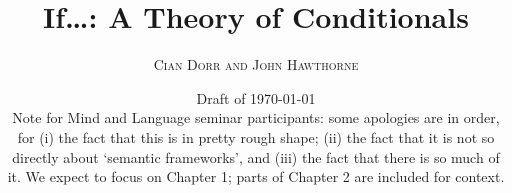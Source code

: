 \documentclass[leqno, 11pt, a5paper, openany]{book}
\begin{document}
\frontmatter
\pagestyle{front}
\title{If…: A Theory of Conditionals}
\author{\textsc{Cian Dorr and John Hawthorne}}
\date{Draft of \today\\
$\quad$\\
Note for Mind and Language seminar participants: some apologies are in order, for (i) the fact that this is in pretty rough shape; (ii) the fact that it is not so directly about ‘semantic frameworks’, and (iii) the fact that there is so much of it.  We expect to focus on Chapter 1; parts of Chapter 2 are included for context.}

$\quad$\pagebreak

\maketitle

\tableofcontents

\mainmatter
\pagestyle{main}

\begin{comment}

\end{comment}







\begin{comment}



\end{comment}

\printbibliography[heading=bibintoc]
\end{document}
